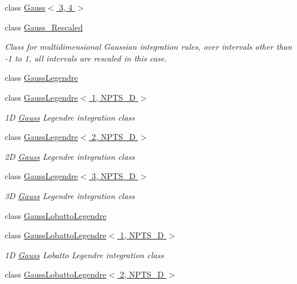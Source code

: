 \begin{DoxyCompactItemize}
\item 
class \hyperlink{classoomph_1_1Gauss_3_013_00_014_01_4}{Gauss$<$ 3, 4 $>$}
\item 
class \hyperlink{classoomph_1_1Gauss__Rescaled}{Gauss\+\_\+\+Rescaled}
\begin{DoxyCompactList}\small\item\em Class for multidimensional Gaussian integration rules, over intervals other than -\/1 to 1, all intervals are rescaled in this case. \end{DoxyCompactList}\item 
class \hyperlink{classoomph_1_1GaussLegendre}{Gauss\+Legendre}
\item 
class \hyperlink{classoomph_1_1GaussLegendre_3_011_00_01NPTS__1D_01_4}{Gauss\+Legendre$<$ 1, N\+P\+T\+S\+\_\+D $>$}
\begin{DoxyCompactList}\small\item\em 1D \hyperlink{classoomph_1_1Gauss}{Gauss} Legendre integration class \end{DoxyCompactList}\item 
class \hyperlink{classoomph_1_1GaussLegendre_3_012_00_01NPTS__1D_01_4}{Gauss\+Legendre$<$ 2, N\+P\+T\+S\+\_\+D $>$}
\begin{DoxyCompactList}\small\item\em 2D \hyperlink{classoomph_1_1Gauss}{Gauss} Legendre integration class \end{DoxyCompactList}\item 
class \hyperlink{classoomph_1_1GaussLegendre_3_013_00_01NPTS__1D_01_4}{Gauss\+Legendre$<$ 3, N\+P\+T\+S\+\_\+D $>$}
\begin{DoxyCompactList}\small\item\em 3D \hyperlink{classoomph_1_1Gauss}{Gauss} Legendre integration class \end{DoxyCompactList}\item 
class \hyperlink{classoomph_1_1GaussLobattoLegendre}{Gauss\+Lobatto\+Legendre}
\item 
class \hyperlink{classoomph_1_1GaussLobattoLegendre_3_011_00_01NPTS__1D_01_4}{Gauss\+Lobatto\+Legendre$<$ 1, N\+P\+T\+S\+\_\+D $>$}
\begin{DoxyCompactList}\small\item\em 1D \hyperlink{classoomph_1_1Gauss}{Gauss} Lobatto Legendre integration class \end{DoxyCompactList}\item 
class \hyperlink{classoomph_1_1GaussLobattoLegendre_3_012_00_01NPTS__1D_01_4}{Gauss\+Lobatto\+Legendre$<$ 2, N\+P\+T\+S\+\_\+D $>$}

\end{DoxyCompactItemize}
